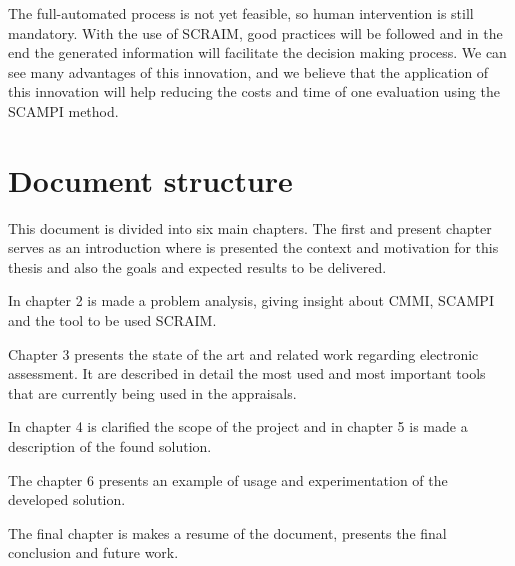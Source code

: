 The full-automated process is not yet feasible, so human intervention is still mandatory. With the use of SCRAIM, good practices will be followed and in the end the generated information will facilitate the decision making process. We can see many advantages of this innovation, and we believe that the application of this innovation will help reducing the costs and time of one evaluation using the SCAMPI method.

\section{Document structure} \label{sec:Structure}

This document is divided into six main chapters. The first and present chapter serves as an introduction where is presented the context and motivation for this thesis and also the goals and expected results to be delivered.

In chapter 2 is made a problem analysis, giving insight about CMMI, SCAMPI and the tool to be used SCRAIM.

Chapter 3 presents the state of the art and related work regarding electronic assessment. It are described in detail the most used and most important tools that are currently being used in the appraisals.

In chapter 4 is clarified the scope of the project and in chapter 5 is made a description of the found solution.

The chapter 6 presents an example of usage and experimentation of the developed solution.

The final chapter is makes a resume of the document, presents the final conclusion and future work.